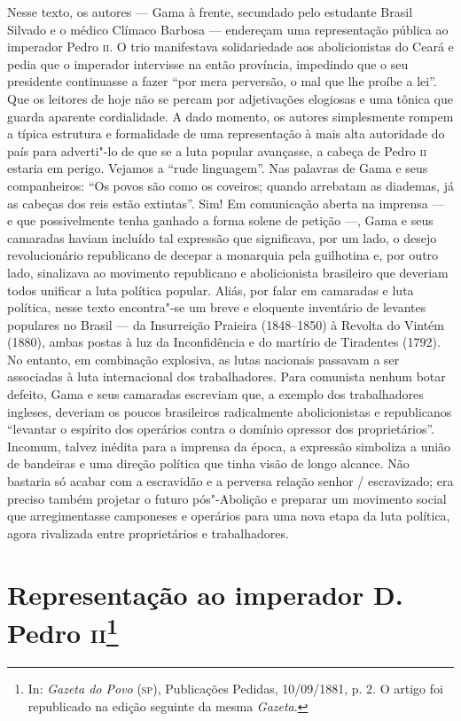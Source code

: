 \paginabranca
\mbox{}\vfill
\thispagestyle{empty}

{\small\noindent
Nesse texto, os autores --- Gama à frente, secundado pelo estudante
Brasil Silvado e o médico Clímaco Barbosa --- endereçam uma representação
pública ao imperador Pedro \textsc{ii}. O trio manifestava solidariedade aos
abolicionistas do Ceará e pedia que o imperador intervisse na então
província, impedindo que o seu presidente continuasse a fazer ``por mera
perversão, o mal que lhe proíbe a lei''. Que os leitores de hoje não se
percam por adjetivações elogiosas e uma tônica que guarda aparente
cordialidade. A dado momento, os autores simplesmente rompem a típica
estrutura e formalidade de uma representação à mais alta autoridade do
país para adverti"-lo de que se a luta popular avançasse, a cabeça de
Pedro \textsc{ii} estaria em perigo. Vejamos a ``rude linguagem''. Nas palavras de Gama e seus
companheiros: ``Os povos são como os coveiros; quando arrebatam as
diademas, já as cabeças dos reis estão extintas''. Sim! Em comunicação
aberta na imprensa --- e que possivelmente tenha ganhado a forma solene
de petição ---, Gama e seus camaradas haviam incluído tal expressão que
significava, por um lado, o desejo revolucionário republicano de decepar
a monarquia pela guilhotina e, por outro lado, sinalizava ao movimento republicano e
abolicionista brasileiro que deveriam todos unificar a luta política
popular. Aliás, por falar em camaradas e luta política, nesse texto
encontra"-se um breve e eloquente inventário de levantes populares no
Brasil --- da Insurreição Praieira (1848--1850) à Revolta do Vintém
(1880), ambas postas à luz da Inconfidência e do martírio de Tiradentes
(1792). No entanto, em combinação explosiva, as lutas nacionais passavam
a ser associadas à luta internacional dos trabalhadores. Para comunista
nenhum botar defeito, Gama e seus camaradas escreviam que, a exemplo dos
trabalhadores ingleses, deveriam os poucos brasileiros radicalmente
abolicionistas e republicanos ``levantar o espírito dos operários contra
o domínio opressor dos proprietários''. Incomum, talvez inédita para a
imprensa da época, a expressão simboliza a união de bandeiras e uma
direção política que tinha visão de longo alcance. Não bastaria só
acabar com a escravidão e a perversa relação senhor / escravizado; era
preciso também projetar o futuro pós"-Abolição e preparar um movimento
social que arregimentasse camponeses e operários para uma nova etapa da
luta política, agora rivalizada entre proprietários e trabalhadores. }

\chapter{Representação ao imperador D.\,Pedro \textsc{ii}\footnote[*]{In:
  \emph{Gazeta do Povo} (\textsc{sp}), Publicações Pedidas, 10/09/1881, p. 2. O
  artigo foi republicado na edição seguinte da mesma \emph{Gazeta}.}}

